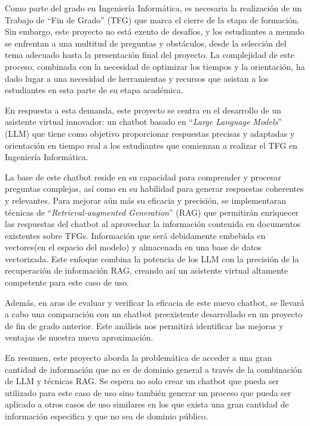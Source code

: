 
Como parte del grado en Ingeniería Informática, es necesaria la realización de un Trabajo de ``Fin de Grado'' (TFG) que marca el cierre de la etapa de formación. Sin embargo, este proyecto no está exento de desafíos, y los estudiantes a menudo se enfrentan a una multitud de preguntas y obstáculos, desde la selección del tema adecuado hasta la presentación final del proyecto\cite{lopez2010final}. La complejidad de este proceso, combinada con la necesidad de optimizar los tiempos y la orientación, ha dado lugar a una necesidad de herramientas y recursos que asistan a los estudiantes en esta parte de su etapa académica\cite{lopez2009proceso}.

En respuesta a esta demanda, este proyecto se centra en el desarrollo de un asistente virtual innovador: un chatbot basado en ``\textit{Large Language Models}'' (LLM) que tiene como objetivo proporcionar respuestas precisas y adaptadas y orientación en tiempo real a los estudiantes que comienzan a realizar el TFG en Ingeniería Informática\cite{Lewis2020}.

La base de este chatbot reside en su capacidad para comprender y procesar preguntas complejas, así como en su habilidad para generar respuestas coherentes y relevantes. Para mejorar aún más su eficacia y precisión, se implementaran técnicas de ``\textit{Retrieval-augmented Generation}'' (RAG) que permitirán enriquecer las respuestas del chatbot al aprovechar la información contenida en documentos existentes sobre TFGs. Información que será debidamente embebida en vectores(en el espacio del modelo) y almacenada en una base de datos vectorizada. Este enfoque combina la potencia de los LLM con la precisión de la recuperación de información RAG, creando así un asistente virtual altamente competente para este caso de uso.

Además, en aras de evaluar y verificar la eficacia de este nuevo chatbot, se llevará a cabo una comparación con un chatbot preexistente desarrollado en un proyecto de fin de grado anterior. Este análisis nos permitirá identificar las mejoras y ventajas de nuestra nueva aproximación.

En resumen, este proyecto aborda la problemática de acceder a una gran cantidad de información que no es de dominio general a través de la combinación de LLM y técnicas RAG. Se espera no solo crear un chatbot que pueda ser utilizado para este caso de uso sino también generar un proceso que pueda ser aplicado a otros casos de uso similares en los que exista una gran cantidad de información especifica y que no sea de dominio público. 




